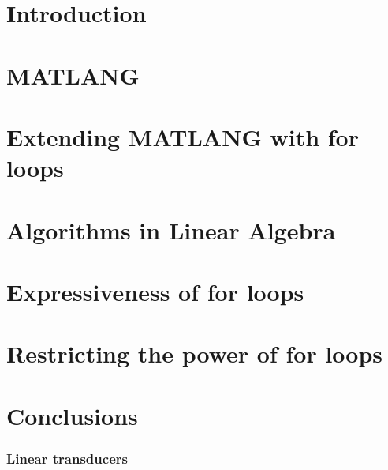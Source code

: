 \documentclass[acmsmall]{acmart}
\begin{document}
 




\maketitle

\section{Introduction}



\section{MATLANG}\label{sec:matlang}


\section{Extending MATLANG with for loops}\label{sec:formatlang}



%

\section{Algorithms in Linear Algebra}\label{sec:queries}


\section{Expressiveness of for loops}\label{sec:circuits}



\section{Restricting the power of for loops}\label{sec:restrict}


\section{Conclusions}\label{sec:conclude}





\newpage


\appendix
\subsubsection{Linear transducers}

%

\end{document}
